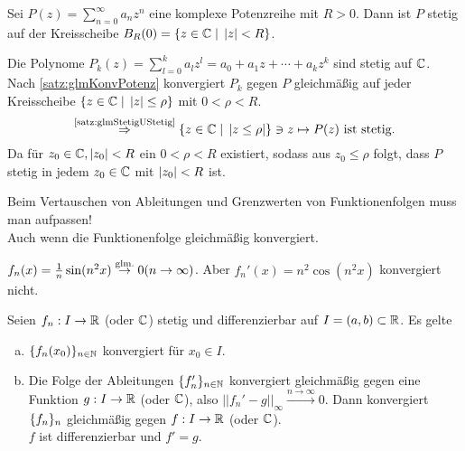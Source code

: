 \documentclass[../ana1.tex]{subfiles}
\begin{document}
\begin{satz}
    Sei \( P(z) = \sum_{n=0}^\infty a_n z^n \) eine komplexe 
    Potenzreihe mit \( R > 0 \). Dann ist \( P \) stetig auf 
    der Kreisscheibe 
    \( B_R(0) = \{ z\in\mathbb{C} \; \vert \; \left|z\right| < R \} \).
\end{satz}
\begin{bew}
    Die Polynome \( P_k(z) = \sum_{l=0}^k a_l z^l = a_0 + a_1 z 
    + \cdots + a_k z^k \) sind stetig auf \( \mathbb{C} \). \\
    Nach \autoref{satz:glmKonvPotenz} konvergiert \( P_k \) 
    gegen \(P\) gleichmäßig auf jeder Kreisscheibe 
    \( \{ z \in \mathbb{C} \; \vert \; \left|z\right| \leq \rho \} \) mit 
    \( 0 < \rho < R \).
    \[ \oversett{\autoref{satz:glmStetigUStetig}}{\Rightarrow} 
    \set{z \in \C \; \vert \; \abs{z \leq \rho}}
    \ni z \mapsto P(z) \text{ ist stetig.} \]
    Da für \( z_0 \in \mathbb{C}, \left|z_0\right| < R \) ein 
    \( 0 < \rho < R \) existiert, sodass aus 
    \( z_0 \leq \rho \) folgt, dass \( P \) stetig 
    in jedem \( z_0 \in \mathbb{C} \) mit \( \left|z_0\right| < R \) ist.
\end{bew}
\begin{bem}
    Beim Vertauschen von Ableitungen und Grenzwerten von 
    Funktionenfolgen muss man aufpassen! \\
    Auch wenn die Funktionenfolge gleichmäßig konvergiert.
\end{bem}
\begin{bsp}
    \( f_n(x) = \frac{1}{n} \sin (n^2 x) 
    \overset{\text{glm.}}{\rightarrow} 0 (n\rightarrow\infty) \).
    Aber \( f_n'(x) = n^2\cos (n^2 x) \) konvergiert nicht.
\end{bsp}
\begin{satz}
    Seien \( f_n : I \rightarrow \mathbb{R} \) (oder \( \mathbb{C} \)) stetig 
    und differenzierbar auf \( I = (a,b) \subset \mathbb{R} \).
    Es gelte 
    \begin{enumerate}[(a)]
        \item \( \{f_n(x_0)\}_{n\in\mathbb{N}} \) konvergiert für 
        \( x_0 \in I \).
        \item Die Folge der Ableitungen 
        \( \{ f_n' \}_{n \in \mathbb{N}} \) 
        konvergiert gleichmäßig gegen eine Funktion 
        \( g: I \rightarrow \mathbb{R} \) (oder \( \mathbb{C} \)), also 
        \( ||f_n' - g||_\infty 
        \overset{n\rightarrow\infty}{\longrightarrow} 0 \).
        Dann konvergiert \( \{f_n\}_n \) gleichmäßig gegen 
        \( f: I \rightarrow \mathbb{R} \) (oder \( \mathbb{C} \)). \\
        \( f \) ist differenzierbar und \( f' = g \).
    \end{enumerate}
\end{satz}
\end{document}
